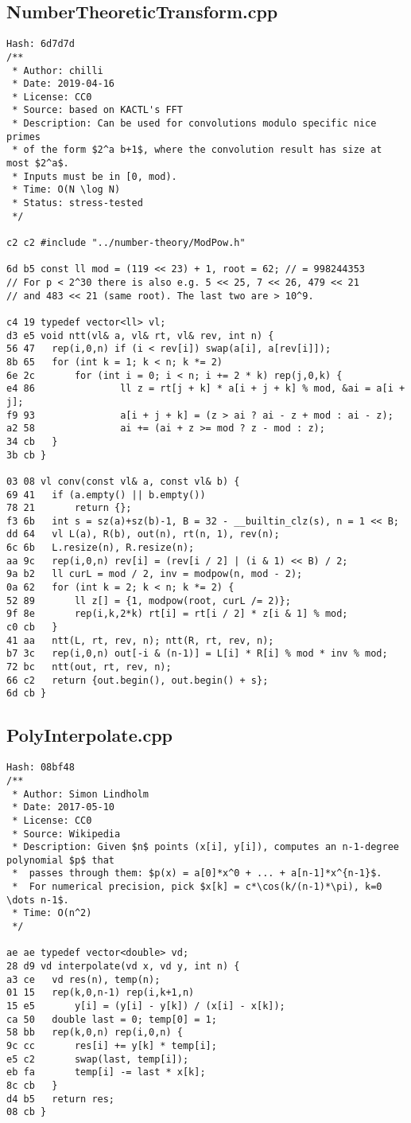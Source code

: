 \documentclass[11pt, a4paper, twoside]{article}
\begin{document}
\subsection{NumberTheoreticTransform.cpp}
\begin{lstlisting}
Hash: 6d7d7d
/**
 * Author: chilli
 * Date: 2019-04-16
 * License: CC0
 * Source: based on KACTL's FFT
 * Description: Can be used for convolutions modulo specific nice primes
 * of the form $2^a b+1$, where the convolution result has size at most $2^a$.
 * Inputs must be in [0, mod).
 * Time: O(N \log N)
 * Status: stress-tested
 */

c2 c2 #include "../number-theory/ModPow.h"

6d b5 const ll mod = (119 << 23) + 1, root = 62; // = 998244353
// For p < 2^30 there is also e.g. 5 << 25, 7 << 26, 479 << 21
// and 483 << 21 (same root). The last two are > 10^9.

c4 19 typedef vector<ll> vl;
d3 e5 void ntt(vl& a, vl& rt, vl& rev, int n) {
56 47 	rep(i,0,n) if (i < rev[i]) swap(a[i], a[rev[i]]);
8b 65 	for (int k = 1; k < n; k *= 2)
6e 2c 		for (int i = 0; i < n; i += 2 * k) rep(j,0,k) {
e4 86 				ll z = rt[j + k] * a[i + j + k] % mod, &ai = a[i + j];
f9 93 				a[i + j + k] = (z > ai ? ai - z + mod : ai - z);
a2 58 				ai += (ai + z >= mod ? z - mod : z);
34 cb 	}
3b cb }

03 08 vl conv(const vl& a, const vl& b) {
69 41 	if (a.empty() || b.empty())
78 21 		return {};
f3 6b 	int s = sz(a)+sz(b)-1, B = 32 - __builtin_clz(s), n = 1 << B;
dd 64 	vl L(a), R(b), out(n), rt(n, 1), rev(n);
6c 6b 	L.resize(n), R.resize(n);
aa 9c 	rep(i,0,n) rev[i] = (rev[i / 2] | (i & 1) << B) / 2;
9a b2 	ll curL = mod / 2, inv = modpow(n, mod - 2);
0a 62 	for (int k = 2; k < n; k *= 2) {
52 89 		ll z[] = {1, modpow(root, curL /= 2)};
9f 8e 		rep(i,k,2*k) rt[i] = rt[i / 2] * z[i & 1] % mod;
c0 cb 	}
41 aa 	ntt(L, rt, rev, n); ntt(R, rt, rev, n);
b7 3c 	rep(i,0,n) out[-i & (n-1)] = L[i] * R[i] % mod * inv % mod;
72 bc 	ntt(out, rt, rev, n);
66 c2 	return {out.begin(), out.begin() + s};
6d cb }
\end{lstlisting}

\subsection{PolyInterpolate.cpp}
\begin{lstlisting}
Hash: 08bf48
/**
 * Author: Simon Lindholm
 * Date: 2017-05-10
 * License: CC0
 * Source: Wikipedia
 * Description: Given $n$ points (x[i], y[i]), computes an n-1-degree polynomial $p$ that
 *  passes through them: $p(x) = a[0]*x^0 + ... + a[n-1]*x^{n-1}$.
 *  For numerical precision, pick $x[k] = c*\cos(k/(n-1)*\pi), k=0 \dots n-1$.
 * Time: O(n^2)
 */

ae ae typedef vector<double> vd;
28 d9 vd interpolate(vd x, vd y, int n) {
a3 ce 	vd res(n), temp(n);
01 15 	rep(k,0,n-1) rep(i,k+1,n)
15 e5 		y[i] = (y[i] - y[k]) / (x[i] - x[k]);
ca 50 	double last = 0; temp[0] = 1;
58 bb 	rep(k,0,n) rep(i,0,n) {
9c cc 		res[i] += y[k] * temp[i];
e5 c2 		swap(last, temp[i]);
eb fa 		temp[i] -= last * x[k];
8c cb 	}
d4 b5 	return res;
08 cb }
\end{lstlisting}
\end{document}
